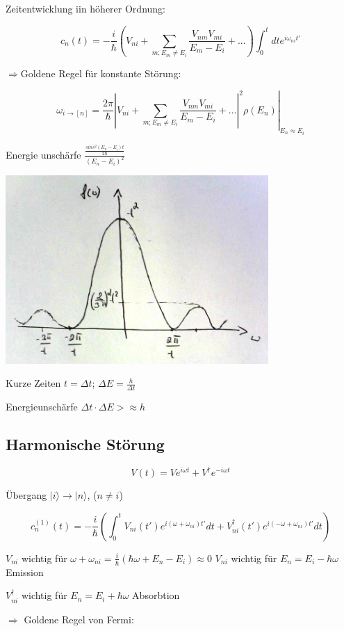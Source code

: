 Zeitentwicklung iin höherer Ordnung:

\[ c_n(t) = -\frac{i}{\hbar} (V_{ni} +\sum_{m; E_m\neq E_i} \frac{ V_{nm}V_{mi} }{E_m-E_i} +...)\int_0^t dt e^{i\omega_{ni}t'} \]

\(\Rightarrow \)Goldene Regel für konstante Störung:

\[\omega_{i\rightarrow [n]} =\left. \frac{2\pi}{\hbar} |V_{ni} +\sum_{m; E_m\neq E_i} \frac{ V_{nm}V_{mi} }{E_m-E_i} +...|^2\rho(E_n)\right|_{E_n\approx E_i} \]

Energie unschärfe \(\frac{\frac{sins^2(E_n-E_i)t}{2\hbar}}{(E_n-E_i)^2}\)

\includegraphics[width=0.75\textwidth]{kap03_07.png}

Kurze Zeiten \(t=\Delta t\); \(\Delta E = \frac{h}{\Delta t}\)

Energieunschärfe \(\Delta t \cdot \Delta E >\approx h\)

\subsection{Harmonische Störung}

\[ V(t) = V e^{i\omega t}+V^\dagger e^{-i\omega t}\]

Übergang \(|i\rangle \rightarrow |n\rangle \), (\(n\neq i\))


\[c^{(1)}_n(t) = -\frac{i}{\hbar} (\int_0^t V_{ni}(t') e^{i(\omega+\omega_{ni})t'}dt + V^{\dagger}_{ni}(t') e^{i(-\omega+\omega_{ni})t'}dt)\]

\(V_{ni}\) wichtig für \(\omega + \omega_{ni} = \frac{i}{\hbar}(\hbar \omega +E_n-E_i)\approx 0\) \(V_{ni}\) wichtig für \(E_n = E_i -\hbar \omega\) Emission

\(V^\dagger_{ni}\) wichtig für \(E_n = E_i +\hbar\omega\) Absorbtion

\(\Rightarrow \) Goldene Regel von Fermi:


